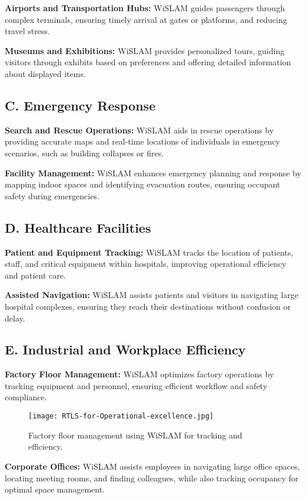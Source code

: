 \documentclass[
	a4paper, %
	11pt, %
	unnumberedsections, %
	twoside, %
]{LTJournalArticle}
\begin{document}
\textbf{Airports and Transportation Hubs:} WiSLAM guides passengers through complex terminals, ensuring timely arrival at gates or platforms, and reducing travel stress.

\textbf{Museums and Exhibitions:} WiSLAM provides personalized tours, guiding visitors through exhibits based on preferences and offering detailed information about displayed items.

\subsection{C.	Emergency Response}
\textbf{Search and Rescue Operations:} WiSLAM aids in rescue operations by providing accurate maps and real-time locations of individuals in emergency scenarios, such as building collapses or fires.

\textbf{Facility Management:} WiSLAM enhances emergency planning and response by mapping indoor spaces and identifying evacuation routes, ensuring occupant safety during emergencies.

\subsection{D.	Healthcare Facilities}
\textbf{Patient and Equipment Tracking:} WiSLAM tracks the location of patients, staff, and critical equipment within hospitals, improving operational efficiency and patient care.

\textbf{Assisted Navigation:} WiSLAM assists patients and visitors in navigating large hospital complexes, ensuring they reach their destinations without confusion or delay.

\subsection{E.	Industrial and Workplace Efficiency}
\textbf{Factory Floor Management:} WiSLAM optimizes factory operations by tracking equipment and personnel, ensuring efficient workflow and safety compliance.

\begin{figure}[h]
    \centering
    \texttt{[image: RTLS-for-Operational-excellence.jpg]}
    \caption{Factory floor management using WiSLAM for tracking and efficiency.}
    \label{fig:RTLS-for-Operational-excellence}
\end{figure}

\textbf{Corporate Offices:} WiSLAM assists employees in navigating large office spaces, locating meeting rooms, and finding colleagues, while also tracking occupancy for optimal space management.
\end{document}

